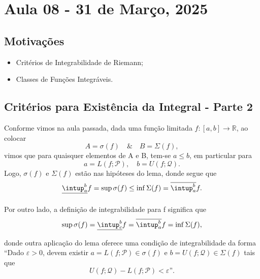 \documentclass[../analysisII_notes.tex]{subfiles}
\begin{document}
\section{Aula 08 - 31 de Março, 2025}
\subsection{Motivações}
\begin{itemize}
	\item Critérios de Integrabilidade de Riemann;
	\item Classes de Funções Integráveis.
\end{itemize}
\subsection{Critérios para Existência da Integral - Parte 2}
Conforme vimos na aula passada, dada uma função limitada \(f:[a, b]\rightarrow \mathbb{R}\), ao colocar
\[
	A = \sigma (f)\quad\&\quad B=\Sigma (f),
\]
vimos que para quaisquer elementos de A e B, tem-se \(a\leq b\), em particular para
\[
	a = L(f; \mathcal{P}),\quad b=U(f; \mathcal{Q}).
\]
Logo, \(\sigma (f)\) e \(\Sigma (f)\) estão nas hipóteses do lema, donde segue que
\[
	\underline{\intup_{a}^{b}}f = \sup_{}\sigma (f)\leq \inf_{}\Sigma (f) = \overline{\intup_{a}^{b}}f.
\]

Por outro lado, a definição de integrabilidade para f significa que
\[
	\sup_{}\sigma (f) = \underline{\intup_{c}^{b}}f = \overline{\intup_{a}^{b}} f = \inf_{}\Sigma (f),
\]
donde outra aplicação do lema oferece uma condição de integrabilidade da forma ``Dado \(\varepsilon >0\), devem existir \(a = L(f; \mathcal{P})\in\sigma (f)\) e \(b=U(f; \mathcal{Q})\in \Sigma (f)\) tais que
\[
	U(f; \mathcal{Q}) - L(f; \mathcal{P})<\varepsilon \text{''.}
\]
\end{document}
